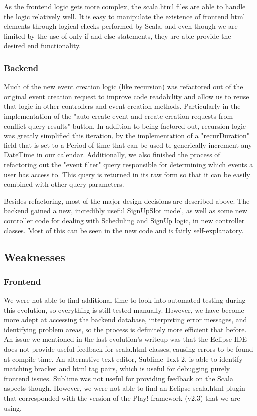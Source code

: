 \documentclass{article}
\begin{document}
	As the frontend logic gets more complex, the scala.html files are able to handle the logic relatively well. It is easy to manipulate the existence of frontend html elements through logical checks performed by Scala, and even though we are limited by the use of only if and else statements, they are able provide the desired end functionality. 

\subsubsection{Backend}

Much of the new event creation logic (like recursion) was refactored out of the original event creation request to improve code readability and allow us to reuse that logic in other controllers and event creation methods. Particularly in the implementation of the "auto create event and create creation requests from conflict query results" button. In addition to being factored out, recursion logic was greatly simplified this iteration, by the implementation of a "recurDuration" field that is set to a Period of time that can be used to generically increment any DateTime in our calendar. Additionally, we also finished the process of refactoring out the "event filter" query responsible for determining which events a user has access to. This query is returned in its raw form so that it can be easily combined with other query parameters.

Besides refactoring, most of the major design decisions are described above. The backend gained a new, incredibly useful SignUpSlot model, as well as some new controller code for dealing with Scheduling and SignUp logic, in new controller classes. Most of this can be seen in the new code and is fairly self-explanatory.

\subsection{Weaknesses}

\subsubsection{Frontend}
We were not able to find additional time to look into automated testing during this evolution, so everything is still tested manually. However, we have become more adept at accessing the backend database, interpreting error messages, and identifying problem areas, so the process is definitely more efficient that before. 
	An issue we mentioned in the last evolution’s writeup was that the Eclipse IDE does not provide useful feedback for scala.html classes, causing errors to be found at compile time. An alternative text editor, Sublime Text 2, is able to identify matching bracket and html tag pairs, which is useful for debugging purely frontend issues. Sublime was not useful for providing feedback on the Scala aspects though. However, we were not able to find an Eclipse scala.html plugin that corresponded with the version of the Play! framework (v2.3) that we are using.
	
\end{document}
